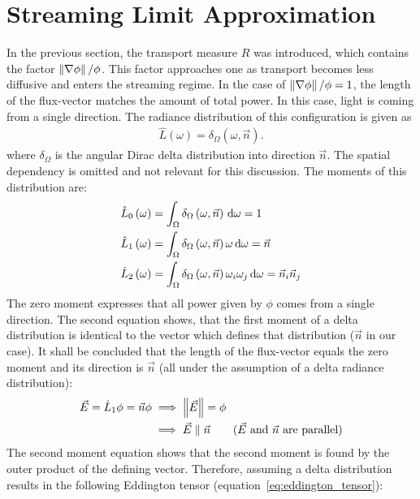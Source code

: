 \section{Streaming Limit Approximation}
\label{sec:fld_streaming_limit_approximation}

In the previous section, the transport measure $R$ was introduced, which contains the factor $\left\lVert\nabla\phi\right\rVert/\phi$. This factor approaches one as transport becomes less diffusive and enters the streaming regime. In the case of $\left\lVert\nabla\phi\right\rVert/\phi=1$, the length of the flux-vector matches the amount of total power. In this case, light is coming from a single direction. The radiance distribution of this configuration is given as
\begin{align}
\hat{L}\left(\omega\right)=\delta_{\Omega}\left(\omega,\vec{n}\right).
\end{align}
where $\delta_{\Omega}$ is the angular Dirac delta distribution into direction $\vec{n}$. The spatial dependency is omitted and not relevant for this discussion. The moments of this distribution are:
\begin{align}
\label{eq:zero_moment_Lhat}
\hat{L}_0\left(\omega\right)&=\int_{\Omega}{\delta_{\Omega}\left(\omega,\vec{n}\right)\,\mathrm{d}\omega} = 1\\
\label{eq:first_moment_Lhat}
\hat{L}_1\left(\omega\right)&=\int_{\Omega}{\delta_{\Omega}\left(\omega,\vec{n}\right)\omega\,\mathrm{d}\omega} = \vec{n}\\
\label{eq:second_moment_Lhat}
\hat{L}_2\left(\omega\right)&=\int_{\Omega}{\delta_{\Omega}\left(\omega,\vec{n}\right)\omega_i\omega_j\,\mathrm{d}\omega} = \vec{n}_i\vec{n}_j
\end{align}
The zero moment expresses that all power given by $\phi$ comes from a single direction. The second equation shows, that the first moment of a delta distribution is identical to the vector which defines that distribution ($\vec{n}$ in our case). It shall be concluded that the length of the flux-vector equals the zero moment and its direction is $\vec{n}$ (all under the assumption of a delta radiance distribution):
\begin{align}
\label{eq:iso_delta_normE}
\vec{E} = \hat{L}_1\phi = \vec{n}\phi  &\implies \left\lVert\vec{E}\right\rVert = \phi\\
&\implies \vec{E} \parallel \vec{n} \qquad \text{($\vec{E}$ and $\vec{n}$ are parallel)}
\end{align}
The second moment equation shows that the second moment is found by the outer product of the defining vector. Therefore, assuming a delta distribution results in the following Eddington tensor (equation~\ref{eq:eddington_tensor}):
